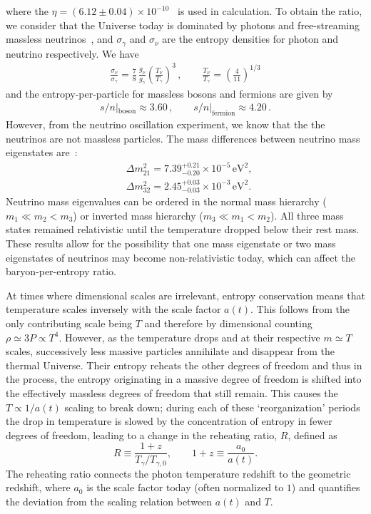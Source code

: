 where the $\eta=(6.12\pm0.04)\times10^{-10}$~\cite{ParticleDataGroup:2022pth} is used in calculation. To obtain the ratio, we consider that the Universe today is dominated by photons and free-streaming massless neutrinos~\cite{Birrell:2012gg}, and $\sigma_\gamma$ and $\sigma_\nu$ are the entropy densities for photon and neutrino respectively. We have
\begin{align}
 \frac{\sigma_\nu}{\sigma_\gamma}=\frac{7}{8}\,\frac{g_\nu}{g_\gamma}\left(\frac{T_\nu}{T_\gamma}\right)^3\,,\qquad\frac{T_\nu}{T_\gamma}=\left(\frac{4}{11}\right)^{1/3}
\end{align}
and the entropy-per-particle for massless bosons and fermions are given by~\cite{Fromerth:2012fe}
\begin{align}
s/n|_\mathrm{boson}\approx 3.60\,,\qquad
s/n|_\mathrm{fermion}\approx 4.20\,.
\end{align}
However, from the neutrino oscillation experiment, we know that the the neutrinos are not massless particles. 
The mass differences between neutrino mass eigenstates are~\cite{ParticleDataGroup:2022pth}:
\begin{align}
&\Delta{m}_{21}^2=7.39^{+0.21}_{-0.20}\times10^{-5}\,\mathrm{eV}^2,\\
&\Delta{m}_{32}^2=2.45^{+0.03}_{-0.03}\times10^{-3}\,\mathrm{eV}^2.
\end{align}
Neutrino mass eigenvalues can be ordered in the normal mass hierarchy ($m_1\ll m_2<m_3$) or inverted mass hierarchy ($m_3\ll m_1<m_2$). All three mass states remained relativistic until the temperature dropped below their rest mass. These results allow for the possibility that one mass eigenstate or two mass eigenstates of neutrinos may become non-relativistic today, which can affect the baryon-per-entropy ratio.


At times where dimensional scales are irrelevant, entropy conservation means that temperature scales inversely with the scale factor $a(t)$. This follows from the only contributing scale being $T$ and therefore by dimensional counting $ \rho\simeq 3P \propto T^4$. However, as the temperature drops and at their respective $m\simeq T$ scales, successively less massive particles annihilate and disappear from the thermal Universe. Their entropy reheats the other degrees of freedom and thus in the process, the entropy originating in a massive degree of freedom is shifted into the effectively massless degrees of freedom that still remain. This causes the $T\propto 1/a(t)$ scaling to break down; during each of these `reorganization' periods the drop in temperature is slowed by the concentration of entropy in fewer degrees of freedom, leading to a change in the reheating ratio, $R$, defined as
\begin{equation}\label{redshiftratio}
R\equiv \frac{1+z}{ T_\gamma/T_{\gamma,0}}, \qquad 1+z\equiv \frac{a_{0}}{a(t)}.
\end{equation}
The reheating ratio connects the photon temperature redshift to the geometric redshift, where $a_0$ is the scale factor today (often normalized to $1$) and quantifies the deviation from the scaling relation between $a(t)$ and $T$.

